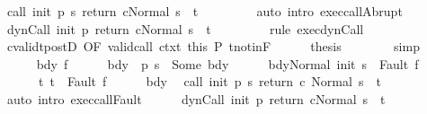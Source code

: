 \begin{isabellebody}
\ {\isachardoublequoteopen}{\isasymGamma}{\isasymturnstile}{\isasymlangle}call\ init\ {\isacharparenleft}p\ s{\isacharparenright}\ return{\isacharprime}\ c{\isacharcomma}Normal\ s{\isasymrangle}\ {\isasymRightarrow}\ t{\isachardoublequoteclose}\ \isanewline
\ \ \ \ \ \ \isamarkupfalse%
\ {\isacharparenleft}auto\ intro{\isacharcolon}\ exec{\isacharunderscore}callAbrupt{\isacharparenright}\isanewline
\ \ \ \ \isamarkupfalse%
\ {\isachardoublequoteopen}{\isasymGamma}{\isasymturnstile}{\isasymlangle}dynCall\ init\ p\ return{\isacharprime}\ c{\isacharcomma}Normal\ s{\isasymrangle}\ {\isasymRightarrow}\ t{\isachardoublequoteclose}\ \isanewline
\ \ \ \ \ \ \isamarkupfalse%
\ {\isacharparenleft}rule\ exec{\isacharunderscore}dynCall{\isacharparenright}\isanewline
\ \ \ \ \isamarkupfalse%
\ cvalidt{\isacharunderscore}postD\ {\isacharbrackleft}OF\ valid{\isacharunderscore}call\ ctxt\ this{\isacharbrackright}\ P\ t{\isacharunderscore}notin{\isacharunderscore}F\isanewline
\ \ \ \ \isamarkupfalse%
\ {\isacharquery}thesis\isanewline
\ \ \ \ \ \ \isamarkupfalse%
\ simp\isanewline
\ \ \isamarkupfalse%
\isanewline
\ \ \ \ \isamarkupfalse%
\ bdy\ f\isanewline
\ \ \ \ \isamarkupfalse%
\ bdy{\isacharcolon}\ {\isachardoublequoteopen}{\isasymGamma}\ {\isacharparenleft}p\ s{\isacharparenright}\ {\isacharequal}\ Some\ bdy{\isachardoublequoteclose}\isanewline
\ \ \ \ \isamarkupfalse%
\ {\isachardoublequoteopen}{\isasymGamma}{\isasymturnstile}{\isasymlangle}bdy{\isacharcomma}Normal\ {\isacharparenleft}init\ s{\isacharparenright}{\isasymrangle}\ {\isasymRightarrow}\ Fault\ f{\isachardoublequoteclose}\ \ \isanewline
\ \ \ \ \ \ t{\isacharcolon}\ {\isachardoublequoteopen}t\ {\isacharequal}\ Fault\ f{\isachardoublequoteclose}\isanewline
\ \ \ \ \isamarkupfalse%
\ bdy\ \isamarkupfalse%
\ {\isachardoublequoteopen}{\isasymGamma}{\isasymturnstile}{\isasymlangle}call\ init\ {\isacharparenleft}p\ s{\isacharparenright}\ return{\isacharprime}\ c\ {\isacharcomma}Normal\ s{\isasymrangle}\ {\isasymRightarrow}\ t{\isachardoublequoteclose}\isanewline
\ \ \ \ \ \ \isamarkupfalse%
\ {\isacharparenleft}auto\ intro{\isacharcolon}\ exec{\isacharunderscore}callFault{\isacharparenright}\isanewline
\ \ \ \ \isamarkupfalse%
\ {\isachardoublequoteopen}{\isasymGamma}{\isasymturnstile}{\isasymlangle}dynCall\ init\ p\ return{\isacharprime}\ c{\isacharcomma}Normal\ s{\isasymrangle}\ {\isasymRightarrow}\ t{\isachardoublequoteclose}\ \isanewline

\end{isabellebody}
